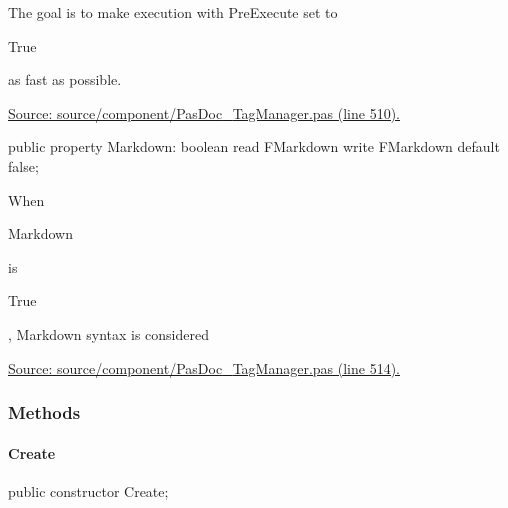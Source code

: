 \documentclass{report}
\newif\ifpdf
\begin{document}
\begin{list}{}
\begin{itemize}
The goal is to make execution with PreExecute set to \begin{ttfamily}True\end{ttfamily} as fast as possible.
\end{itemize}\par
\href{https://github.com/pasdoc/pasdoc/blob/master/source/component/PasDoc_TagManager.pas#L510}{Source: source/component/PasDoc{\_}TagManager.pas (line 510).}\label{PasDoc_TagManager.TTagManager-Markdown}
\item[\textbf{Markdown}\hfill]
\ifpdf
\begin{flushleft}
\fi
\begin{ttfamily}
public property Markdown: boolean
      read FMarkdown write FMarkdown default false;\end{ttfamily}

\ifpdf
\end{flushleft}
\fi


\par When \begin{ttfamily}Markdown\end{ttfamily} is \begin{ttfamily}True\end{ttfamily}, Markdown syntax is considered\par
\href{https://github.com/pasdoc/pasdoc/blob/master/source/component/PasDoc_TagManager.pas#L514}{Source: source/component/PasDoc{\_}TagManager.pas (line 514).}\end{list}
\subsubsection*{\large{\textbf{Methods}}\normalsize\hspace{1ex}\hfill}
\paragraph*{Create}\hspace*{\fill}

\label{PasDoc_TagManager.TTagManager-Create}
\begin{list}{}{
\setlength{\itemindent}{0cm}
\setlength{\listparindent}{0cm}
\setlength{\leftmargin}{\evensidemargin}
\addtolength{\leftmargin}{\tmplength}
\settowidth{\labelsep}{X}
\addtolength{\leftmargin}{\labelsep}
\setlength{\labelwidth}{\tmplength}
}
\item[\textbf{Declaration}\hfill]
\ifpdf
\begin{flushleft}
\fi
\begin{ttfamily}
public constructor Create;\end{ttfamily}

\ifpdf
\end{flushleft}
\fi

\end{list}
\end{document}
